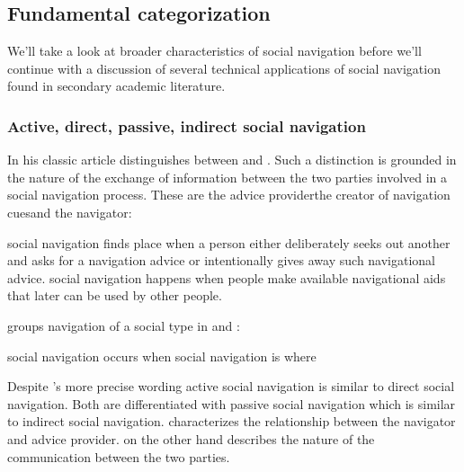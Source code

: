 \subsection{Fundamental categorization}
\label{section:social.navigation.fundamental.categorization}

We'll take a look at broader characteristics of social navigation
before we'll continue with a discussion of several technical applications of
social navigation found in secondary academic literature.

\subsubsection{Active, direct, passive, \oldand indirect social navigation}

In his classic article \citet{dieberger97} distinguishes between
 and .
Such a distinction is grounded in the nature of the exchange of information
between the two parties involved in a social navigation process.
These are the advice provider\dash{}the creator of navigation
cues\dash{}and the navigator:

\begin{items}
   social navigation finds place when a person either
    deliberately seeks out another and asks for a navigation advice or
    intentionally gives away such navigational advice.
   social navigation happens when people make available
    navigational aids that later can be used by other people.
\end{items}

\citeauthor{svensson03} groups navigation of a social type in
 and :

\begin{items}
   social navigation occurs when
   social navigation is where
\end{items}

Despite \citeauthor{svensson03}'s more precise wording active social
navigation is similar to direct social navigation. Both are differentiated
with passive social navigation which is similar to indirect social navigation.
\citeauthor{dieberger97} characterizes the relationship between the
navigator and advice provider. \citeauthor{svensson03} on the other hand
describes the nature of the communication between the two parties.

